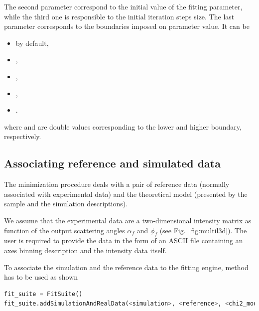 The second parameter  correspond to the initial value of
the fitting parameter, while the third one
is responsible to the initial iteration steps size.
The last parameter  corresponds to
the boundaries imposed on parameter value. It can be
\begin{itemize}
\item {} by default, 
\item {}, 
\item {}, 
\item {}, 
\item {}.
\end{itemize}
where  and  are
double values corresponding to the lower and higher boundary, respectively.


%
\subsection{Associating reference and simulated data}

The minimization procedure deals with a pair of reference data (normally
associated with experimental data) and the theoretical model (presented by the sample and the simulation descriptions).

We assume that the experimental data are a two-dimensional intensity 
matrix as function of the output scattering
angles $\alpha_f$ and $\phi_f$ (see Fig.~\ref{fig:multil3d}).
The user is required to provide the data in the form of an ASCII file
containing an axes
binning description and the intensity data itself. 
\vspace*{2mm}

\vspace*{1mm}

To associate the simulation and the reference data to the fitting engine, method \newline
{} has to be used as shown
\begin{lstlisting}[language=python, style=eclipseboxed,numbers=none]
fit_suite = FitSuite()
fit_suite.addSimulationAndRealData(<simulation>, <reference>, <chi2_module>)
\end{lstlisting}

